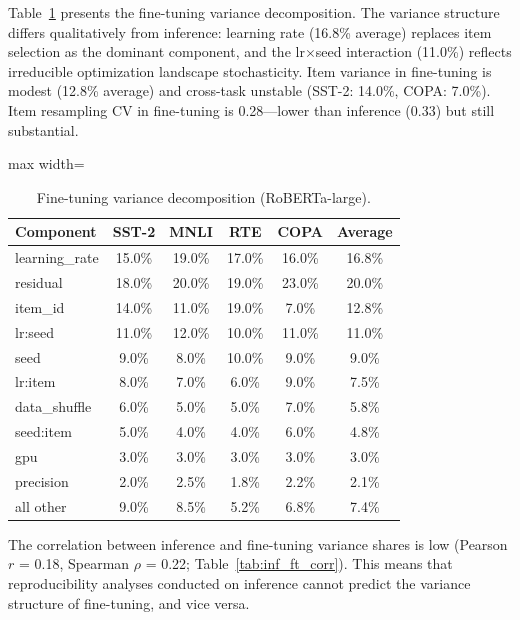 \documentclass[11pt]{article}
\begin{document}
Table~\ref{tab:finetune} presents the fine-tuning variance decomposition.
The variance structure differs qualitatively from inference: learning rate (16.8\% average) replaces item selection as the dominant component, and the lr$\times$seed interaction (11.0\%) reflects irreducible optimization landscape stochasticity.
Item variance in fine-tuning is modest (12.8\% average) and cross-task unstable (SST-2: 14.0\%, COPA: 7.0\%).
Item resampling CV in fine-tuning is 0.28---lower than inference (0.33) but still substantial.

\begin{table}[t]
\centering
\caption{Fine-tuning variance decomposition (RoBERTa-large).}
\label{tab:finetune}
\begin{adjustbox}{max width=\textwidth}
\begin{tabular}{lccccc}
\toprule
Component & SST-2 & MNLI & RTE & COPA & Average \\
\midrule
learning\_rate  & 15.0\% & 19.0\% & 17.0\% & 16.0\% & 16.8\% \\
residual        & 18.0\% & 20.0\% & 19.0\% & 23.0\% & 20.0\% \\
item\_id        & 14.0\% & 11.0\% & 19.0\% & 7.0\%  & 12.8\% \\
lr:seed         & 11.0\% & 12.0\% & 10.0\% & 11.0\% & 11.0\% \\
seed            & 9.0\%  & 8.0\%  & 10.0\% & 9.0\%  & 9.0\%  \\
lr:item         & 8.0\%  & 7.0\%  & 6.0\%  & 9.0\%  & 7.5\%  \\
data\_shuffle   & 6.0\%  & 5.0\%  & 5.0\%  & 7.0\%  & 5.8\%  \\
seed:item       & 5.0\%  & 4.0\%  & 4.0\%  & 6.0\%  & 4.8\%  \\
gpu             & 3.0\%  & 3.0\%  & 3.0\%  & 3.0\%  & 3.0\%  \\
precision       & 2.0\%  & 2.5\%  & 1.8\%  & 2.2\%  & 2.1\%  \\
all other       & 9.0\%  & 8.5\%  & 5.2\%  & 6.8\%  & 7.4\%  \\
\bottomrule
\end{tabular}
\end{adjustbox}
\end{table}

The correlation between inference and fine-tuning variance shares is low (Pearson $r$ = 0.18, Spearman $\rho$ = 0.22; Table~\ref{tab:inf_ft_corr}).
This means that reproducibility analyses conducted on inference cannot predict the variance structure of fine-tuning, and vice versa.
\end{document}
